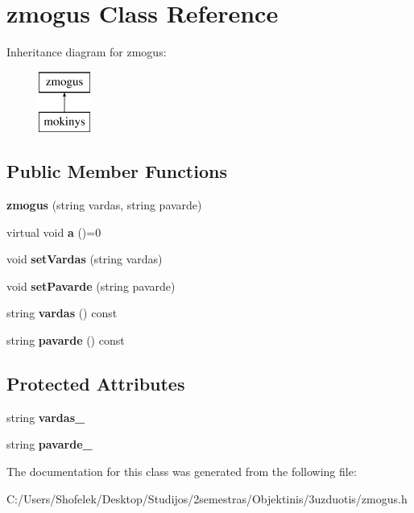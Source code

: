 \hypertarget{classzmogus}{}\section{zmogus Class Reference}
\label{classzmogus}
Inheritance diagram for zmogus\+:\begin{figure}[H]
\begin{center}
\leavevmode
\includegraphics[height=2.000000cm]{classzmogus}
\end{center}
\end{figure}
\subsection*{Public Member Functions}
\begin{DoxyCompactItemize}
\item 
\mbox{\label{classzmogus_aaf1526d2d99fa9252a51c3ec689ee848}} 
{\bfseries zmogus} (string vardas, string pavarde)
\item 
\mbox{\label{classzmogus_a21cdb259c715e67071a02a33d9eaef5f}} 
virtual void {\bfseries a} ()=0
\item 
\mbox{\label{classzmogus_a10a035e6a1dbae1a00410f646bfea62a}} 
void {\bfseries set\+Vardas} (string vardas)
\item 
\mbox{\label{classzmogus_ad4d205d7c1b5bf2dd8be55bf513a997f}} 
void {\bfseries set\+Pavarde} (string pavarde)
\item 
\mbox{\label{classzmogus_a3c272bfac2ad007b42372c2934c39ee9}} 
string {\bfseries vardas} () const
\item 
\mbox{\label{classzmogus_aaa7462a96db6e69b3cec33be0e02c2d3}} 
string {\bfseries pavarde} () const
\end{DoxyCompactItemize}
\subsection*{Protected Attributes}
\begin{DoxyCompactItemize}
\item 
\mbox{\label{classzmogus_ad20a48c056323b41af24f6891e671404}} 
string {\bfseries vardas\+\_\+}
\item 
\mbox{\label{classzmogus_a4df33c060374e0a9853d3fda824f0deb}} 
string {\bfseries pavarde\+\_\+}
\end{DoxyCompactItemize}


The documentation for this class was generated from the following file\+:\begin{DoxyCompactItemize}
\item 
C\+:/\+Users/\+Shofelek/\+Desktop/\+Studijos/2semestras/\+Objektinis/3uzduotis/zmogus.\+h\end{DoxyCompactItemize}
